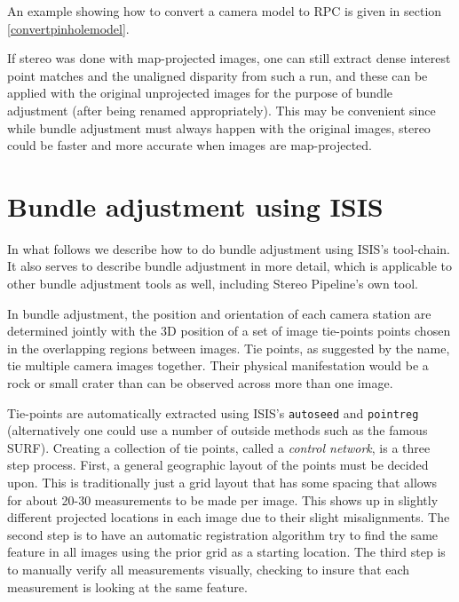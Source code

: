 An example showing how to convert a camera model to RPC is given in
section \ref{convertpinholemodel}.

If stereo was done with map-projected images, one can still extract 
dense interest point matches and the unaligned disparity from such a run,
and these can be applied with the original unprojected images for the purpose
of bundle adjustment (after being renamed appropriately). This may be convenient
since while bundle adjustment must always happen with the original images, 
stereo could be faster and more accurate when images are map-projected.

\section{Bundle adjustment using ISIS}

In what follows we describe how to do bundle adjustment using
\ac{ISIS}'s tool-chain. It also serves to describe bundle adjustment in more
detail, which is applicable to other bundle adjustment tools as well,
including Stereo Pipeline's own tool.

In bundle adjustment, the position and orientation of each camera
station are determined jointly with the 3D position of a set of image
tie-points points chosen in the overlapping regions between
images. Tie points, as suggested by the name, tie multiple camera images
together. Their physical manifestation would be a rock or small crater
than can be observed across more than one image.

Tie-points are automatically extracted using \ac{ISIS}'s
\texttt{autoseed} and \texttt{pointreg} (alternatively one could use a
number of outside methods such as the famous SURF\citep{surf08}).
Creating a collection of tie points, called a {\it control network}, is
a three step process. First, a general geographic layout of the points
must be decided upon. This is traditionally just a grid layout that has
some spacing that allows for about 20-30 measurements to be made per
image. This shows up in slightly different projected
locations in each image due to their slight misalignments. The second step
is to have an automatic registration algorithm try to find the same feature
in all images using the prior grid as a starting location. The third
step is to manually verify all measurements visually, checking to insure
that each measurement is looking at the same feature.

